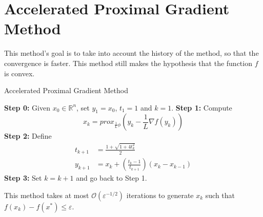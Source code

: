 \documentclass[12pt, openany]{report}
\theoremstyle{definition}
\begin{document}
\section{Accelerated Proximal Gradient Method}
This method's goal is to take into account the history of the method, so that the convergence is faster. This method still makes the hypothesis that the function \(f\) is convex.
\begin{algorithm}[H]\label{algo:Acc_prox}
    \caption{Accelerated Proximal Gradient Method}
    \begin{algorithmic}[1]
    \State \textbf{Step 0:} Given $x_0 \in \mathbb{R}^n$, set \(y_1=x_0\), \(t_1=1\) and $k=1$.
    \State \textbf{Step 1:} Compute 
    \begin{equation}
        x_k = prox_{\frac{1}{L}\phi}\left(y_k-\frac{1}{L}\nabla f(y_k)\right)
    \end{equation}
    \State \textbf{Step 2:} Define 
    \begin{align}
        t_{k+1} &= \frac{1+\sqrt{1+4t_k^2}}{2}\\
        y_{k+1} &= x_k + \left(\frac{t_k-1}{t_{k+1}}\right)(x_k-x_{k-1})      
    \end{align}
    \State \textbf{Step 3:} Set \(k=k+1\) and go back to Step 1.
    \end{algorithmic}
\end{algorithm}
This method takes at most \(\mathcal{O}(\varepsilon^{-1/2})\) iterations to generate \(x_k\) such that \(f(x_k)-f(x^*)\le \varepsilon\).
\end{document}
